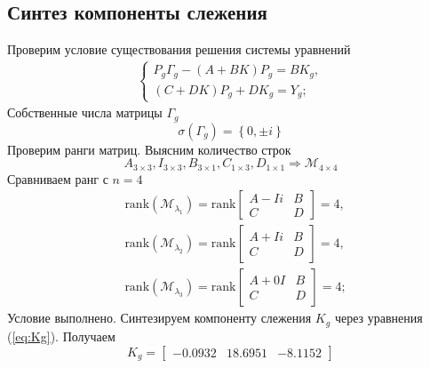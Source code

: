 \documentclass[a4paper, 12pt]{article}
\begin{document}
    \subsection{Синтез компоненты слежения}
    Проверим условие существования решения
    системы уравнений
    \begin{align}
    \begin{cases}
    P_g\Gamma_g-\left( A+BK \right)P_g=BK_g,\\
    \left( C+DK \right)P_g+DK_g=Y_g;
    \end{cases} \label{eq:Kg}
    \end{align}
    Собственные числа матрицы $\Gamma_g$
    $$
    \sigma\left( \Gamma_g \right)=\left\{ 0,\pm i \right\}
    $$
    Проверим ранги матриц. Выясним количество строк
    $$A_{3\times3},I_{3\times3},B_{3\times1},C_{1\times3},D_{1\times1}\Rightarrow \mathcal{M}_{4\times4}$$
    Сравниваем ранг с $n=4$
    \begin{align*}
    &\text{rank}\left( \mathcal{M}_{\lambda_1} \right)=\text{rank}\begin{bmatrix}
        A-Ii &B\\
        C &D
    \end{bmatrix}=4,\\
    &\text{rank}\left( \mathcal{M}_{\lambda_2} \right)=\text{rank}\begin{bmatrix}
        A+Ii &B\\
        C &D
    \end{bmatrix}=4,\\
    &\text{rank}\left( \mathcal{M}_{\lambda_3} \right)=\text{rank}\begin{bmatrix}
        A+0I &B\\
        C &D
    \end{bmatrix}=4;
    \end{align*}
    Условие выполнено. Синтезируем компоненту слежения $K_g$ через уравнения (\ref{eq:Kg}).
    Получаем
    $$
    K_g=
    \begin{bmatrix}
        -0.0932   &18.6951   &-8.1152
    \end{bmatrix}
    $$
\end{document}
